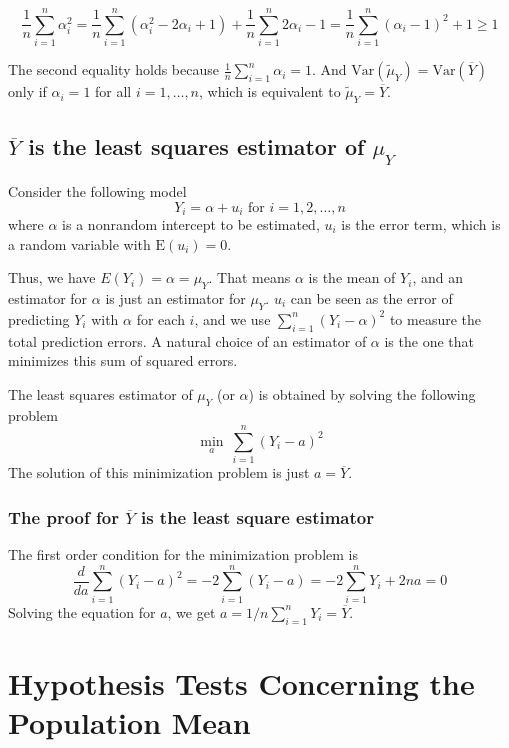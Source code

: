 \documentclass[a4paper,11pt]{article}
\begin{document}
\[
\frac{1}{n}\sum_{i=1}^n \alpha_i^2 = \frac{1}{n} \sum_{i=1}^n
(\alpha_i^2 - 2\alpha_i + 1) + \frac{1}{n}\sum_{i=1}^n 2\alpha_i - 1 =
\frac{1}{n} \sum_{i=1}^n (\alpha_i - 1)^2 + 1 \geq 1 \] 

The second equality holds because \(\frac{1}{n} \sum_{i=1}^n \alpha_i =
1\).  And \(\mathrm{Var}(\tilde{\mu}_Y) = \mathrm{Var}(\overline{Y})\)
only if \(\alpha_i = 1\) for all \(i=1, \ldots, n\), which is equivalent
to \(\tilde{\mu}_Y = \overline{Y}\).

\subsection{\(\overline{Y}\) is the least squares estimator of \(\mu_Y\)}
\label{sec:org70f0d1f}

Consider the following model
  \[ Y_i = \alpha + u_i \text{ for } i = 1, 2, \ldots, n \]
where \(\alpha\) is a nonrandom intercept to be estimated, \(u_i\) is
the error term, which is a random variable with \(\mathrm{E}(u_i) = 0\). 

Thus, we have \(E(Y_i) = \alpha = \mu_Y\). That means \(\alpha\) is the
mean of \(Y_i\), and an estimator for \(\alpha\) is just an estimator for
\(\mu_Y\). \(u_i\) can be seen as the error of predicting \(Y_i\) with
\(\alpha\) for each \(i\), and we use \(\sum_{i=1}^n (Y_i - \alpha)^2\) to
measure the total prediction errors. A natural choice of an estimator
of \(\alpha\) is the one that minimizes this sum of squared errors. 

The least squares estimator of \(\mu_Y\) (or \(\alpha\)) is obtained by
solving the following problem
  \[ \operatorname*{min}_a\: \sum_{i=1}^n (Y_i - a)^2 \]
The solution of this minimization problem is just \(a = \overline{Y}\). 

\subsubsection*{The proof for \(\overline{Y}\) is the least square estimator}
\label{sec:org671d556}

The first order condition for the minimization problem is
\begin{equation*}
  \frac{d}{da}\sum_{i=1}^n (Y_i - a)^2 = -2\sum_{i=1}^n(Y_i - a) = -2\sum_{i=1}^n Y_i+ 2n a = 0      
\end{equation*}
Solving the equation for \(a\), we get \(a = 1/n\sum_{i=1}^n Y_i = \overline{Y}\).


\section{Hypothesis Tests Concerning the Population Mean}
\label{sec:orga3b7dd9}
\end{document}
